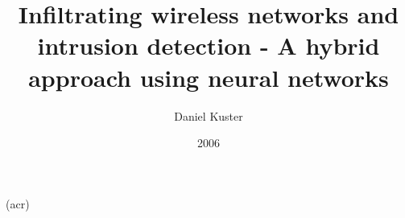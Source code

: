 \documentclass[11pt, a4paper, oneside, titlepage, headsepline]{book}
\begin{document}

\author{Daniel Kuster}
\title{Infiltrating wireless networks and intrusion detection - A hybrid approach using neural networks}
\date{2006}

\frontmatter



\cfoot[\pagemark]{\pagemark}










\begin{spacing}{0.89}
\tableofcontents
\end{spacing}

\mainmatter







\listoffigures
\listoftables
\printglosstex(acr)



\end{document}
